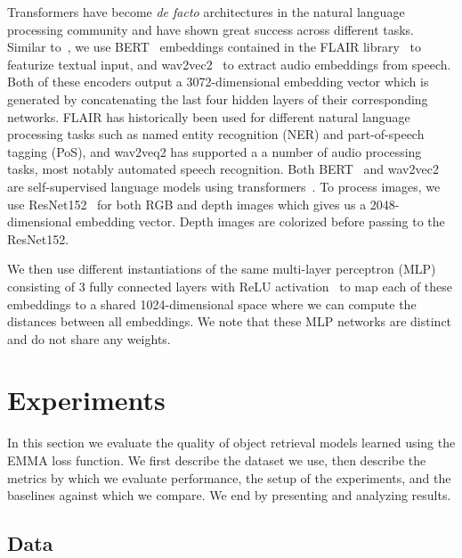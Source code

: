 \documentclass[10pt]{article} %
\begin{document}
Transformers have become \textit{de facto} architectures in the natural language processing community and have shown great success across different tasks. Similar to~\citet{GoLD_UMBC}, we use BERT~\citep{devlin-etal-2019-bert} embeddings contained in the FLAIR library~\citep{akbik2019flair,akbik-etal-2019-pooled} to featurize textual input, and wav2vec2~\citep{wav2vec2} to extract audio embeddings from speech. Both of these encoders output a 3072-dimensional embedding vector which is generated by concatenating the last four hidden layers of their corresponding networks.
FLAIR has historically been used for different natural language processing tasks such as named entity recognition (NER) and part-of-speech tagging (PoS), and wav2veq2 has supported a a number of audio processing tasks, most notably automated speech recognition.
Both BERT~\citep{devlin-etal-2019-bert} and wav2vec2~\citep{wav2vec2} are self-supervised language models using transformers~\citep{vaswani2017attention}.
% 
To process images, we use ResNet152~\citep{He_resnet_2016} for both RGB and depth images which gives us a 2048-dimensional embedding vector. Depth images are colorized before passing to the ResNet152.

We then use different instantiations of the same multi-layer perceptron (MLP) consisting of 3 fully connected layers with ReLU activation~\citep{relu2010} to map each of these embeddings to a shared 1024-dimensional space where we can compute the distances between all embeddings. We note that these MLP networks are distinct and do not share any weights.






\section{Experiments}
\label{sec:Experiments}

In this section we evaluate the quality of object retrieval models learned using the EMMA loss function. We first describe the dataset we use, then describe the metrics by which we evaluate performance, the setup of the experiments, and the baselines against which we compare. We end by presenting and analyzing results.

\subsection{Data}
\label{sec:Data}
\end{document}
